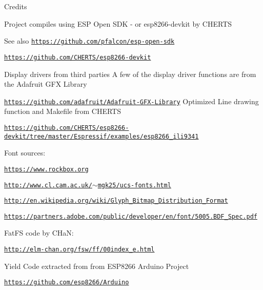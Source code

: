 \begin{DoxyParagraph}{Credits}

\begin{DoxyItemize}
\item Project compiles using E\+SP Open S\+DK -\/ or esp8266-\/devkit by C\+H\+E\+R\+TS 
\end{DoxyItemize}
\end{DoxyParagraph}
\begin{DoxySeeAlso}{See also}
\href{https://github.com/pfalcon/esp-open-sdk}{\tt https\+://github.\+com/pfalcon/esp-\/open-\/sdk} 

\href{https://github.com/CHERTS/esp8266-devkit}{\tt https\+://github.\+com/\+C\+H\+E\+R\+T\+S/esp8266-\/devkit}
\begin{DoxyItemize}
\item Display drivers from third parties A few of the display driver functions are from the Adafruit G\+FX Library 
\end{DoxyItemize}

\href{https://github.com/adafruit/Adafruit-GFX-Library}{\tt https\+://github.\+com/adafruit/\+Adafruit-\/\+G\+F\+X-\/\+Library} Optimized Line drawing function and Makefile from C\+H\+E\+R\+TS 

\href{https://github.com/CHERTS/esp8266-devkit/tree/master/Espressif/examples/esp8266_ili9341}{\tt https\+://github.\+com/\+C\+H\+E\+R\+T\+S/esp8266-\/devkit/tree/master/\+Espressif/examples/esp8266\+\_\+ili9341}
\begin{DoxyItemize}
\item Font sources\+: 
\end{DoxyItemize}

\href{https://www.rockbox.org}{\tt https\+://www.\+rockbox.\+org} 

\href{http://www.cl.cam.ac.uk/~mgk25/ucs-fonts.html}{\tt http\+://www.\+cl.\+cam.\+ac.\+uk/$\sim$mgk25/ucs-\/fonts.\+html} 

\href{http://en.wikipedia.org/wiki/Glyph_Bitmap_Distribution_Format}{\tt http\+://en.\+wikipedia.\+org/wiki/\+Glyph\+\_\+\+Bitmap\+\_\+\+Distribution\+\_\+\+Format} 

\href{https://partners.adobe.com/public/developer/en/font/5005.BDF_Spec.pdf}{\tt https\+://partners.\+adobe.\+com/public/developer/en/font/5005.\+B\+D\+F\+\_\+\+Spec.\+pdf}
\begin{DoxyItemize}
\item Fat\+FS code by C\+HaN\+: 
\end{DoxyItemize}

\href{http://elm-chan.org/fsw/ff/00index_e.html}{\tt http\+://elm-\/chan.\+org/fsw/ff/00index\+\_\+e.\+html}
\begin{DoxyItemize}
\item Yield Code extracted from from E\+S\+P8266 Arduino Project 
\end{DoxyItemize}

\href{https://github.com/esp8266/Arduino}{\tt https\+://github.\+com/esp8266/\+Arduino} 


\end{DoxySeeAlso}
